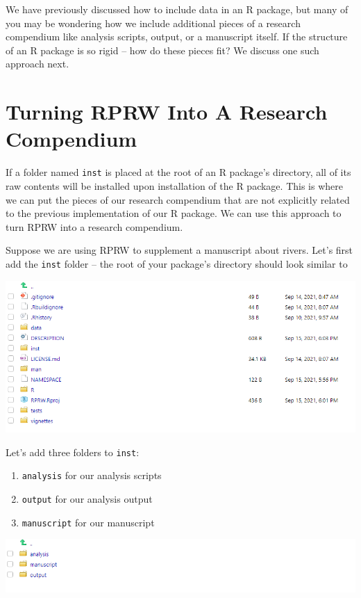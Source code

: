\documentclass[
]{book}
\providecommand{\tightlist}{%
  \setlength{\itemsep}{0pt}\setlength{\parskip}{0pt}}
\begin{document}
We have previously discussed how to include data in an R package, but many of you may be wondering how we include additional pieces of a research compendium like analysis scripts, output, or a manuscript itself. If the structure of an R package is so rigid -- how do these pieces fit? We discuss one such approach next.

\hypertarget{turning-rprw-into-a-research-compendium}{%
\section{Turning RPRW Into A Research Compendium}\label{turning-rprw-into-a-research-compendium}}

If a folder named \texttt{inst} is placed at the root of an R package's directory, all of its raw contents will be installed upon installation of the R package. This is where we can put the pieces of our research compendium that are not explicitly related to the previous implementation of our R package. We can use this approach to turn RPRW into a research compendium.

Suppose we are using RPRW to supplement a manuscript about rivers. Let's first add the \texttt{inst} folder -- the root of your package's directory should look similar to

\includegraphics[width=1\linewidth]{images/newrpack_files9}

Let's add three folders to \texttt{inst}:

\begin{enumerate}
\def\labelenumi{\arabic{enumi}.}
\tightlist
\item
  \texttt{analysis} for our analysis scripts
\item
  \texttt{output} for our analysis output
\item
  \texttt{manuscript} for our manuscript
\end{enumerate}

\includegraphics[width=1\linewidth]{images/newrpack_files10}
\end{document}
